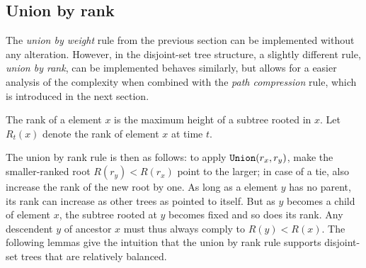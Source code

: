 \subsection{Union by rank}
The \emph{union by weight} rule from the previous section can be implemented without any alteration. However, in the disjoint-set tree structure, a slightly different rule, \emph{union by rank}, can be implemented behaves similarly, but allows for a easier analysis of the complexity when combined with the \emph{path compression} rule, which is introduced in the next section. 

\begin{definition}
  The rank of a element $x$ is the maximum height of a subtree rooted in $x$. Let $R_t(x)$ denote the rank of element $x$ at time $t$. 
\end{definition}

The union by rank rule is then as follows: to apply $\texttt{Union}(r_x,r_y)$, make the smaller-ranked root $R(r_y) < R(r_x)$ point to the larger; in case of a tie, also increase the rank of the new root by one. As long as a element $y$ has no parent, its rank can increase as other trees as pointed to itself. But as $y$ becomes a child of element $x$, the subtree rooted at $y$ becomes fixed and so does its rank. Any descendent $y$ of ancestor $x$ must thus always comply to $R(y)<R(x)$. The following lemmas give the intuition that the union by rank rule supports disjoint-set trees that are relatively balanced.

